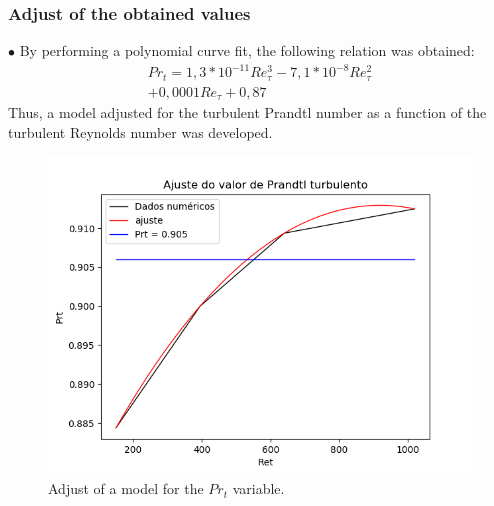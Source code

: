 \documentclass[xcolor=dvipsnames,8pt,aspectratio=34]{beamer}
\begin{document}
	
	
	
	
		\begin{frame}
		\frametitle{Adjust of the obtained values}
		\begin{minipage}[h!]{0.48\textwidth}
			$\bullet$ By performing a polynomial curve fit, the following relation was obtained:
			\begin{equation}
			\begin{split}
			Pr_t = 1,3 * 10^{-11} Re_\tau^3 - 7,1 * 10^{-8} Re_\tau^2 \\ + 0,0001 Re_\tau + 0,87 
			\end{split}
			\end{equation}
			Thus, a model adjusted for the turbulent Prandtl number as a function of the turbulent Reynolds number was developed.
		\end{minipage}
		\begin{minipage}[h!]{0.45\textwidth}
			\begin{figure}
				\centering
				\includegraphics[angle=0, scale=0.43]{ajustePrandtl}
				\caption{Adjust of a model for the $ Pr_t $ variable.}
			\end{figure}
		\end{minipage}\\
		\end{frame}	
	
	
	
	
	
\end{document}
